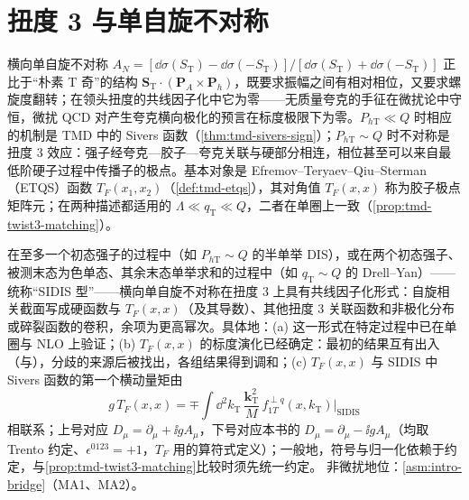 \section{扭度 3 与单自旋不对称}\label{sec:power-twist3}

横向单自旋不对称 $A_N=[\dd\sigma(S_{\mathrm T})-\dd\sigma(-S_{\mathrm T})]/[\dd\sigma(S_{\mathrm T})+\dd\sigma(-S_{\mathrm T})]$ 正比于“朴素 T 奇”的结构 $\mathbf S_{\mathrm T}\cdot(\mathbf P_A\times\mathbf P_h)$，既要求振幅之间有相对相位，又要求螺旋度翻转；在领头扭度的共线因子化中它为零——无质量夸克的手征在微扰论中守恒，微扰 QCD 对产生夸克横向极化的预言在标度极限下为零\cite{Kane:1978nd}。$P_{h\mathrm T}\ll Q$ 时相应的机制是 TMD 中的 Sivers 函数（\cref{thm:tmd-sivers-sign}）；$P_{h\mathrm T}\sim Q$ 时不对称是扭度 3 效应：强子经夸克—胶子—夸克关联与硬部分相连，相位甚至可以来自最低阶硬子过程中传播子的极点\cite{EfremovTeryaev1985,QiuSterman1991c}。基本对象是 Efremov--Teryaev--Qiu--Sterman（ETQS）函数 $T_F(x_1,x_2)$（\cref{def:tmd-etqs}）\cite{Efremov:1981sh,EfremovTeryaev1985,QiuSterman1991c}，其对角值 $T_F(x,x)$ 称为胶子极点矩阵元；在两种描述都适用的 $\Lambda\ll q_{\mathrm T}\ll Q$，二者在单圈上一致\cite{Ji:2006ub}（\cref{prop:tmd-twist3-matching}）。

\begin{proposition}\label{prop:power-twist3-sidis}
在至多一个初态强子的过程中（如 $P_{h\mathrm T}\sim Q$ 的半单举 DIS），或在两个初态强子、被测末态为色单态、其余末态单举求和的过程中（如 $q_{\mathrm T}\sim Q$ 的 Drell--Yan）——统称“SIDIS 型”——横向单自旋不对称在扭度 3 上具有共线因子化形式：自旋相关截面写成硬函数与 $T_F(x,x)$（及其导数）、其他扭度 3 关联函数和非极化分布或碎裂函数的卷积，余项为更高幂次。具体地：(a) 这一形式在特定过程中已在单圈与 NLO 上验证\cite{Ji:2006ub,Vogelsang:2009pj}；(b) $T_F(x,x)$ 的标度演化已经确定：最初的结果互有出入（\cite{Braun:2009mi}与\cite{Kang:2008ey}），分歧的来源后被找出，各组结果得到调和\cite{Kang:2012em,Schafer:2012ra}；(c) $T_F(x,x)$ 与 SIDIS 中 Sivers 函数的第一个横动量矩由
\begin{equation}\label{eq:power-TF-sivers}
g\,T_F(x,x)=\mp\int\!\dd^2k_{\mathrm T}\,\frac{\mathbf k_{\mathrm T}^2}{M}\,f^{\perp q}_{1T}(x,k_{\mathrm T})\Big|_{\mathrm{SIDIS}}
\end{equation}
相联系；上号对应 $D_\mu=\partial_\mu+\ii gA_\mu$，下号对应本书的 $D_\mu=\partial_\mu-\ii gA_\mu$（均取 Trento 约定、$\epsilon^{0123}=+1$，$T_F$ 用\cite[式~(8)]{Kang:2011hk}的算符式定义）；一般地，符号与归一化依赖于约定\cite{Boer:2003cm}，与\cref{prop:tmd-twist3-matching}比较时须先统一约定。
非微扰地位：\cref{asm:intro-bridge}（MA1、MA2）。
\end{proposition}

